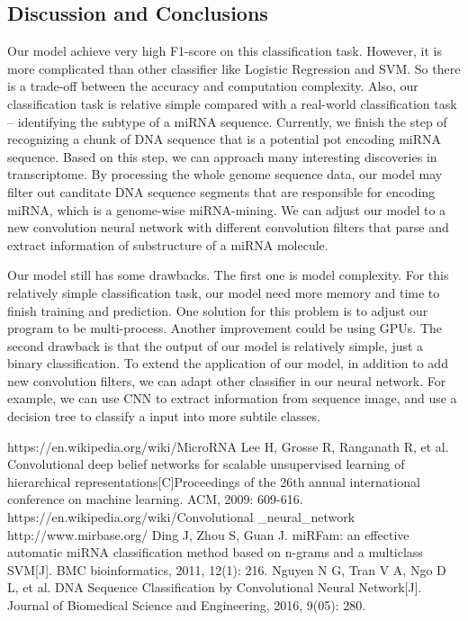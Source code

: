\documentclass[letterpaper, 11pt]{article}
\begin{document}
\begin{multicols*}{2}
{\subsection{Discussion and Conclusions}
Our model achieve very high F1-score on this classification task. However, it is more complicated than other classifier like Logistic Regression and SVM. So there is a trade-off between the accuracy and computation complexity. Also, our classification task is relative simple compared with a real-world classification task -- identifying the subtype of a miRNA sequence. Currently, we finish the step of recognizing a chunk of DNA sequence that is a potential pot encoding miRNA sequence. Based on this step, we can approach many interesting discoveries in transcriptome. By processing the whole genome sequence data, our model may filter out canditate DNA sequence segments that are responsible for encoding miRNA, which is a genome-wise miRNA-mining. We can adjust our model to a new convolution neural network with different convolution filters that parse and extract information of substructure of a miRNA molecule.

Our model still has some drawbacks. The first one is model complexity. For this relatively simple classification task, our model need more memory and time to finish training and prediction. One solution for this problem is to adjust our program to be multi-process. Another improvement could be using GPUs. The second drawback is that the output of our model is relatively simple, just a binary classification. To extend the application of our model, in addition to add new convolution filters, we can adapt other classifier in our neural network. For example, we can use CNN to extract information from sequence image, and use a decision tree to classify a input into more subtile classes.
}
\end{multicols*}

\newpage
\begin{multicols*}{2}

\begin{thebibliography}{1}
https://en.wikipedia.org/wiki/MicroRNA 
Lee H, Grosse R, Ranganath R, et al. Convolutional deep belief networks for scalable unsupervised learning of hierarchical representations[C]Proceedings of the 26th annual international conference on machine learning. ACM, 2009: 609-616. 
https://en.wikipedia.org/wiki/Convolutional
\_neural\_network
http://www.mirbase.org/
Ding J, Zhou S, Guan J. miRFam: an effective automatic miRNA classification method based on n-grams and a multiclass SVM[J]. BMC bioinformatics, 2011, 12(1): 216.
Nguyen N G, Tran V A, Ngo D L, et al. DNA Sequence Classification by Convolutional Neural Network[J]. Journal of Biomedical Science and Engineering, 2016, 9(05): 280.
\end{thebibliography}

\end{multicols*}
\end{document}
